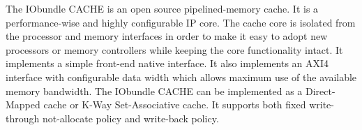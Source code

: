 The IObundle CACHE is an open source pipelined-memory cache. It is a performance-wise and highly configurable IP core. The cache core is isolated from the processor and memory interfaces in order to make it easy to adopt new processors or memory controllers while keeping the core functionality intact. It implements a simple front-end native interface. It also implements an AXI4 interface with configurable data width which allows maximum use of the available memory bandwidth. The IObundle CACHE can be implemented as a Direct-Mapped cache or K-Way Set-Associative cache. It supports both fixed write-through not-allocate policy and write-back policy.
